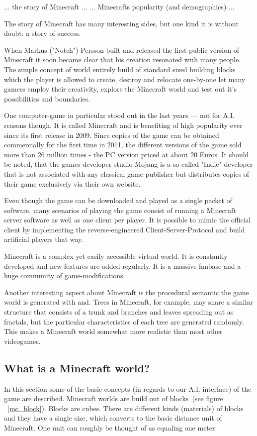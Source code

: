 ... the story of Minecraft ...
... Minecrafts popularity (and demographics) ...

The story of Minecraft has many interesting sides, but one kind it is without doubt: a story of success.

When Markus ("Notch") Persson built and released the first public version of Minecraft it soon became clear that his creation resonated with many people. The simple concept of world entirely build of standard sized building blocks which the player is allowed to create, destroy and relocate one-by-one let many gamers employ their creativity, explore the Minecraft world and test out it's possibilities and boundaries.

One computer-game in particular stood out in the last years --- not for A.I. reasons though. It is called Minecraft and is benefiting of high popularity ever since its first release in 2009. Since copies of the game can be obtained commercially for the first time in 2011, the different versions of the game sold more than 26 million times - the PC version priced at about 20 Euros. It should be noted, that the games developer studio Mojang is a so called "Indie" developer that is not associated with any classical game publisher but distributes copies of their game exclusively via their own website.

Even though the game can be downloaded and played as a single packet of software, many scenarios of playing the game consist of running a Minecraft server software as well as one client per player. It is possible to mimic the official client by implementing the reverse-engineered Client-Server-Protocol and build artificial players that way.

Minecraft is a complex yet easily accessible virtual world. It is constantly developed and new features are added regularly. It is a massive fanbase and a huge community of game-modifications.

Another interesting aspect about Minecraft is the procedural semantic the game world is generated with and. Trees in Minecraft, for example, may share a similar structure that consists of a trunk and branches and leaves spreading out as fractals, but the particular characteristics of each tree are generated randomly. This makes a Minecraft world somewhat more realistic than most other videogames.

        \subsection{What is a Minecraft world?}
In this section some of the basic concepts (in regards to our A.I. interface) of the game are described. Minecraft worlds are build out of blocks~(see figure ~\ref{mc_block}). Blocks are cubes. There are different kinds (materials) of blocks and they have a single size, which converts to the basic distance unit of Minecraft. One unit can roughly be thought of as equaling one meter.


